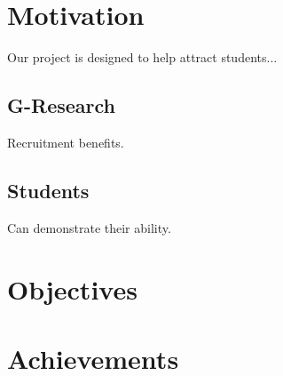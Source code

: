 \section{Motivation}
Our project is designed to help attract students...
\subsection{G-Research}
Recruitment benefits.
\subsection{Students}
Can demonstrate their ability.
\section{Objectives}

\section{Achievements}

